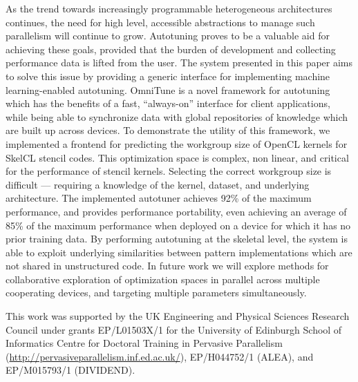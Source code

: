 \documentclass[nonatbib,preprint,nocopyrightspace,9pt]{sigplanconf}
\begin{document}
  As the trend towards increasingly programmable heterogeneous architectures
  continues, the need for high level, accessible abstractions to manage such
  parallelism will continue to grow. Autotuning proves to be a valuable aid for
  achieving these goals, provided that the burden of development and collecting
  performance data is lifted from the user. The system presented in this paper
  aims to solve this issue by providing a generic interface for implementing
  machine learning-enabled autotuning. OmniTune is a novel framework for
  autotuning which has the benefits of a fast, ``always-on'' interface for client
  applications, while being able to synchronize data with global repositories of
  knowledge which are built up across devices. To demonstrate the utility of this
  framework, we implemented a frontend for predicting the workgroup size of OpenCL
  kernels for SkelCL stencil codes. This optimization space is complex, non
  linear, and critical for the performance of stencil kernels. Selecting the
  correct workgroup size is difficult --- requiring a knowledge of the kernel,
  dataset, and underlying architecture. The implemented autotuner achieves 92\% of
  the maximum performance, and provides performance portability, even achieving an
  average of 85\% of the maximum performance when deployed on a device for which
  it has no prior training data. By performing autotuning at the skeletal level,
  the system is able to exploit underlying similarities between pattern
  implementations which are not shared in unstructured code. In future work we
  will explore methods for collaborative exploration of optimization spaces in
  parallel across multiple cooperating devices, and targeting multiple parameters
  simultaneously.

  \acks

  This work was supported by the UK Engineering and Physical Sciences Research
  Council under grants EP/L01503X/1 for the University of Edinburgh School of
  Informatics Centre for Doctoral Training in Pervasive Parallelism
  (\url{http://pervasiveparallelism.inf.ed.ac.uk/}), EP/H044752/1 (ALEA), and
  EP/M015793/1 (DIVIDEND).

  \label{bibliography}
  \printbibliography
\end{document}
